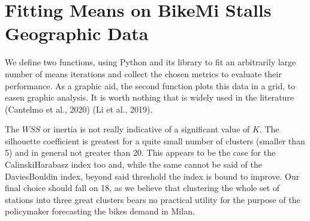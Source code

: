 \documentclass[letterpaper,10pt,english]{jupyterBook}
\begin{document}
\section{Fitting \sphinxhyphen{}Means on BikeMi Stalls Geographic Data}
\label{\detokenize{04-stations_kmeans:fitting-k-means-on-bikemi-stalls-geographic-data}}
\sphinxAtStartPar
We define two functions, using Python and its  library to fit an arbitrarily large number of \sphinxhyphen{}means iterations and collect the chosen metrics to evaluate their performance. As a graphic aid, the second function plots this data in a grid, to easen graphic analysis. It is worth nothing that  is widely used in the literature (Cantelmo et al., 2020) (Li et al., 2019).

\sphinxAtStartPar
The \(WSS\) or inertia is not really indicative of a significant value of \(K\). The silhouette coefficient is greatest for a quite small number of clusters (smaller than 5) and in general not greater than 20. This appears to be the case for the Calinski\sphinxhyphen{}Harabasz index too and, while the same cannot be said of the Davies\sphinxhyphen{}Bouldin index, beyond said threshold the index is bound to improve. Our final choice should fall on 18, as we believe that clustering the whole set of stations into three great clusters bears no practical utility for the purpose of the policymaker \sphinxhyphen{} forecasting the bikes demand in Milan.
\end{document}
